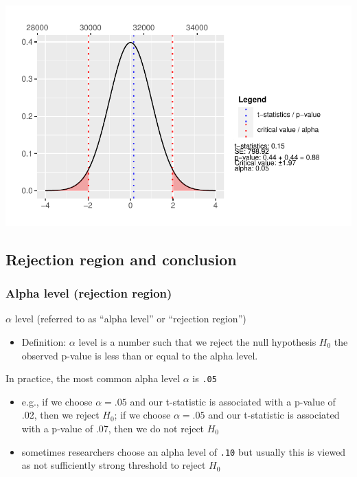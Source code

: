 \documentclass[
  letterpaper,
  DIV=11,
  numbers=noendperiod]{scrartcl}
\providecommand{\tightlist}{%
  \setlength{\itemsep}{0pt}\setlength{\parskip}{0pt}}\usepackage{longtable,booktabs,array}
\begin{document}
\includegraphics{SSS_5.1-Lecture_files/figure-pdf/unnamed-chunk-11-1.pdf}

\subsection{Rejection region and
conclusion}\label{rejection-region-and-conclusion}

\subsubsection{Alpha level (rejection
region)}\label{alpha-level-rejection-region}

\(\alpha\) level (referred to as ``alpha level'' or ``rejection
region'')

\begin{itemize}
\tightlist
\item
  Definition: \(\alpha\) level is a number such that we reject the null
  hypothesis \(H_0\) the observed p-value is less than or equal to the
  alpha level.
\end{itemize}

In practice, the most common alpha level \(\alpha\) is \texttt{.05}

\begin{itemize}
\tightlist
\item
  e.g., if we choose \(\alpha= .05\) and our t-statistic is associated
  with a p-value of .02, then we reject \(H_0\); if we choose
  \(\alpha= .05\) and our t-statistic is associated with a p-value of
  .07, then we do not reject \(H_0\)
\item
  sometimes researchers choose an alpha level of \texttt{.10} but
  usually this is viewed as not sufficiently strong threshold to reject
  \(H_0\)
\end{itemize}
\end{document}
